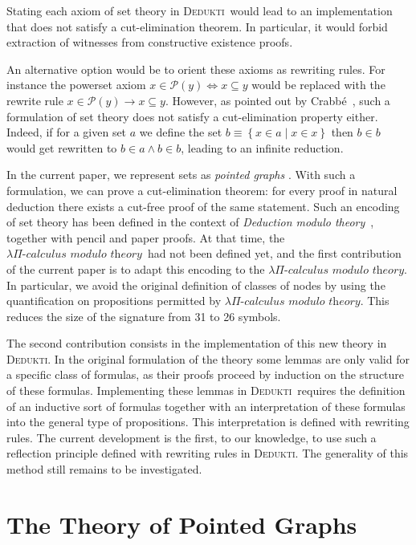 \documentclass[submission,copyright,creativecommons]{eptcs}
\def\lra{\longrightarrow}
\newcommand{\dedukti}{\textsc{Dedukti}}
\newcommand{\lpcm}{$\lambda \Pi\textit{-calculus modulo theory}$}
\begin{document}
Stating each axiom of set theory in \dedukti ~would lead to an implementation that does not satisfy a cut-elimination theorem. In particular, it would forbid extraction of witnesses from constructive existence proofs.

An alternative option would be to orient these axioms as rewriting rules. For instance the powerset axiom $x \in \mathcal{P}(y) \Leftrightarrow x \subseteq y$ would be replaced with the rewrite rule $x \in \mathcal{P}(y) \lra x \subseteq y$. However, as pointed out by Crabbé~\cite{crabbe}, such a formulation of set theory does not satisfy a cut-elimination property either. Indeed, if for a given set $a$ we define the set $b\equiv\left\{x\in a\middle|x\in x\right\}$ then $b\in b$ would get rewritten to $b\in a\wedge b\in b$, leading to an infinite reduction.

In the current paper, we represent sets as \textit{pointed graphs} \cite{pointed}. With such a formulation, we can prove a cut-elimination theorem: for every proof in natural deduction there exists a cut-free proof of the same statement. Such an encoding of set theory has been defined in the context of \textit{Deduction modulo theory}~\cite{zermodulo}, together with pencil and paper proofs. At that time, the \lpcm ~had not been defined yet, and the first contribution of the current paper is to adapt this encoding to the \lpcm. In particular, we avoid the original definition of classes of nodes by using the quantification on propositions permitted by \lpcm. This reduces the size of the signature from 31 to 26 symbols.

The second contribution consists in the implementation of this new theory in \dedukti. In the original formulation of the theory some lemmas are only valid for a specific class of formulas, as their proofs proceed by induction on the structure of these formulas. Implementing these lemmas in \dedukti ~requires the definition of an inductive sort of formulas together with an interpretation of these formulas into the general type of propositions. This interpretation is defined with rewriting rules. The current development is the first, to our knowledge, to use such a reflection principle defined with rewriting rules in \dedukti. The generality of this method still remains to be investigated.

\section{The Theory of Pointed Graphs}
\end{document}
